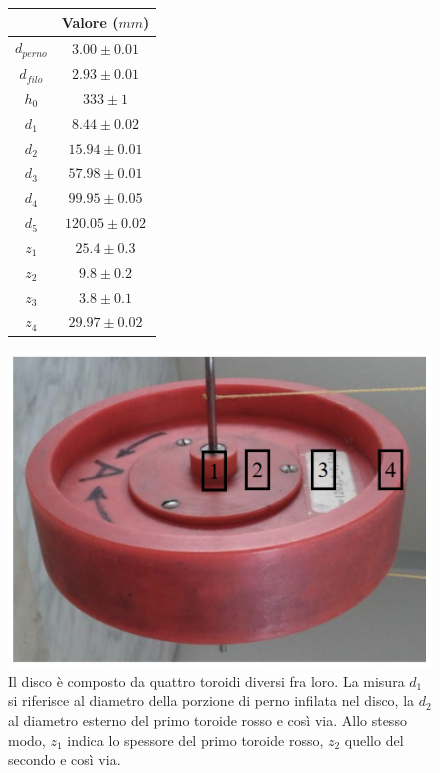 \documentclass{article}
\begin{document}
\begin{figure}[ht!]
\centering
\begin{minipage}{.5\textwidth}
\centering
\begin{tabular}{|c|c|}
\hline
 & Valore ($mm$) \\
\hline
$d_{perno}$ & $3.00 \pm 0.01$ \\
\hline
$d_{filo}$ & $2.93 \pm 0.01$ \\
\hline
$h_{0}$ & $333 \pm 1$ \\
\hline
$d_{1}$ & $8.44 \pm 0.02$ \\
\hline
$d_{2}$ & $15.94 \pm 0.01$ \\
\hline
$d_{3}$ & $57.98 \pm 0.01$ \\
\hline
$d_{4}$ & $99.95 \pm 0.05$ \\
\hline
$d_{5}$ & $120.05 \pm 0.02$ \\
\hline
$z_{1}$ & $25.4 \pm 0.3$ \\
\hline
$z_{2}$ & $9.8 \pm 0.2$ \\
\hline
$z_{3}$ & $3.8 \pm 0.1$ \\
\hline
$z_{4}$ & $29.97 \pm 0.02$ \\
\hline
\end{tabular}
\end{minipage}%
\begin{minipage}{.5\textwidth}
\centering
\includegraphics[width=\textwidth]{images/toroide.png}
\end{minipage}
\caption{Il disco è composto da quattro toroidi diversi fra loro. La misura $d_1$ si riferisce al diametro della porzione di perno infilata nel disco, la $d_2$ al diametro esterno del primo toroide rosso e così via. Allo stesso modo, $z_1$ indica lo spessore del primo toroide rosso, $z_2$ quello del secondo e così via.}
\label{figure:schema_disco}
\end{figure}
\end{document}
